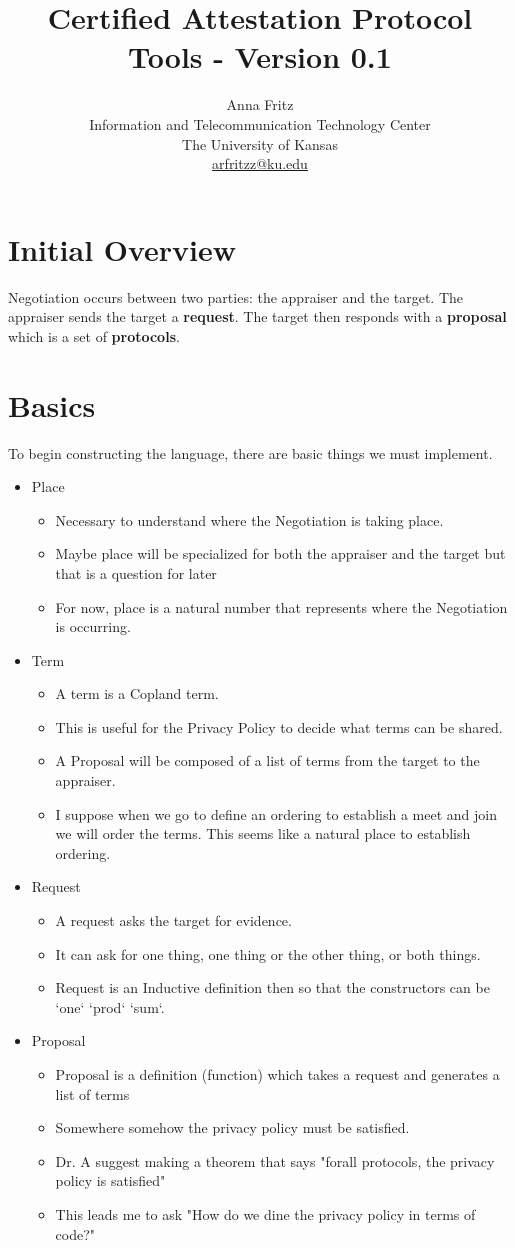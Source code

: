 \documentclass[10pt]{article}
\title{Certified Attestation Protocol Tools - Version 0.1}
\author{Anna Fritz \\
  Information and Telecommunication Technology Center \\
  The University of Kansas \\
  \url{arfritzz@ku.edu}
}
\newcommand{\squash}{\itemsep=0pt\parskip=0pt}
\begin{document}
\section {Initial Overview}

  Negotiation occurs between two parties: the appraiser and the target. 
  The appraiser sends the target a \textbf{request}. The target then responds
  with a \textbf{proposal} which is a set of \textbf{protocols}.

\section {Basics}

To begin constructing the language, there are basic things we must implement. 

\begin{itemize}
\item Place
	\begin{itemize}
	\squash
	\item Necessary to understand where the Negotiation is taking place.
	\item Maybe place will be specialized for both the appraiser and the target but that is a question for later
	\item For now, place is a natural number that represents where the Negotiation is occurring.  
	\end{itemize}
\item Term
	\begin{itemize}
	\squash
	\item A term is a Copland term. 
	\item This is useful for the Privacy Policy to decide what terms can be shared. 
	\item A Proposal will be composed of a list of terms from the target to the appraiser.
	\item I suppose when we go to define an ordering to establish a meet and join we will order the terms. This seems like a natural place to establish ordering. 
	\end{itemize}
\item Request
	\begin{itemize}
	\item A request asks the target for evidence. 
	\item It can ask for one thing, one thing or the other thing, or both things. 
	\item Request is an Inductive definition then so that the constructors can be `one` `prod` `sum`.
	\end{itemize}
\item Proposal
	\begin{itemize}
	\item Proposal is a definition (function) which takes a request and generates a list of terms
	\item Somewhere somehow the privacy policy must be satisfied. 
	\item Dr. A suggest making a theorem that says "forall protocols, the privacy policy is satisfied"
	\item This leads me to ask "How do we dine the privacy policy in terms of code?"
	\end{itemize}


\end{itemize}
\end{document}
